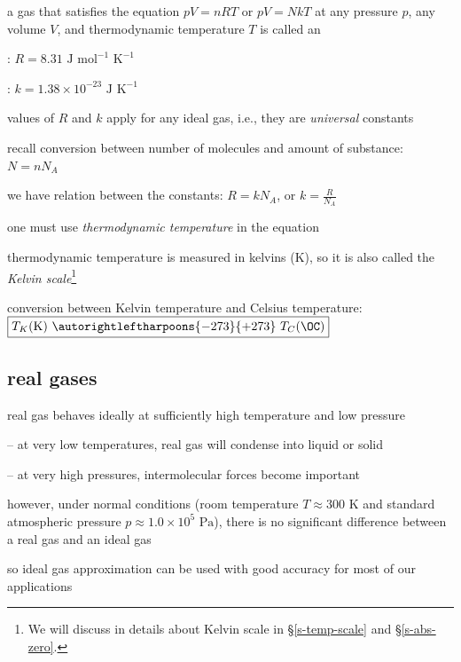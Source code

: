 \begin{ilight}
	a gas that satisfies the equation $\boxed{pV=nRT}$ or $\boxed{pV=NkT}$ at any pressure $p$, any volume $V$, and thermodynamic temperature $T$ is called an 
\end{ilight}

: $R=8.31 \text{ J mol}^{-1}\text{ K}^{-1}$

: $k=1.38\times10^{-23} \text{ J K}^{-1}$

values of $R$ and $k$ apply for any ideal gas, i.e., they are \emph{universal} constants

\cmt recall conversion between number of molecules and amount of substance: $\boxed{N=nN_A}$

we have relation between the constants: $R = kN_A$, or $k=\frac{R}{N_A}$

\cmt one must use \emph{thermodynamic temperature} in the equation

thermodynamic temperature is measured in kelvins (K), so it is also called the \emph{Kelvin scale}\footnote{We will discuss in details about Kelvin scale in \S\ref{s-temp-scale} and \S\ref{s-abs-zero}.}

conversion between Kelvin temperature and Celsius temperature: $\boxed{T_K (\text{K}) \text{ } \autorightleftharpoons{\footnotesize -273}{\footnotesize +273} \text{ } T_C (\OC)}$

\subsection*{real gases}

real gas behaves ideally at sufficiently high temperature and low pressure

\begin{compactitem}
	\item[--] at very low temperatures, real gas will condense into liquid or solid
	
	\item[--] at very high pressures, intermolecular forces become important
\end{compactitem}

however, under normal conditions (room temperature $T \approx 300 \text{ K}$ and standard atmospheric pressure $p \approx 1.0\times10^5 \text{ Pa}$), there is no significant difference between a real gas and an ideal gas

so ideal gas approximation can be used with good accuracy for most of our applications


